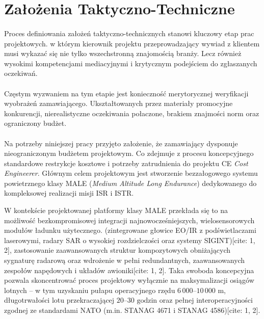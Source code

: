 \section{Założenia Taktyczno-Techniczne}

\paragraph{}
Proces definiowania założeń taktyczno-technicznych stanowi kluczowy etap prac projektowych.
w którym kierownik projektu przeprowadzający wywiad z klientem musi wykazać się nie tylko wszechstronną znajomością branży. 
Lecz również wysokimi kompetencjami mediacyjnymi i krytycznym podejściem do zgłaszanych oczekiwań.

\paragraph{}
Częstym wyzwaniem na tym etapie jest konieczność merytorycznej weryfikacji wyobrażeń zamawiającego.
Ukształtowanych przez materiały promocyjne konkurencji, 
  nierealistyczne oczekiwania połaczone, 
  brakiem znajmości norm oraz ograniczony budżet.

\paragraph{}
Na potrzeby niniejszej pracy przyjęto założenie, 
że zamawiający dysponuje nieograniczonym budżetem projektowym. 
Co zdejmuje z procesu koncepcyjnego standardowe restrykcje kosztowe i potrzeby zatrudnienia do projektu CE \textit{Cost Engineerer}.
Głównym celem projektowym jest stworzenie bezzałogowego systemu powietrznego klasy MALE (\textit{Medium Altitude Long Endurance}) 
dedykowanego do kompleksowej realizacji misji ISR i ISTR. 


W kontekście projektowanej platformy klasy MALE przekłada się to na możliwość bezkompromisowej integracji najnowocześniejszych, 
wielosensorowych modułów ładunku użytecznego.
(zintegrowane głowice EO/IR z podświetlaczami laserowymi, radary SAR o wysokiej 
rozdzielczości oraz systemy SIGINT)[cite: 1, 2], zastosowanie zaawansowanych struktur kompozytowych obniżających sygnaturę radarową oraz 
wdrożenie w pełni redundantnych, zaawansowanych zespołów napędowych i układów awioniki[cite: 1, 2]. 
Taka swoboda koncepcyjna pozwala skoncentrować proces projektowy wyłącznie na maksymalizacji osiągów lotnych –
 w tym uzyskaniu pułapu operacyjnego rzędu $6\,000\text{–}10\,000\text{ m}$, 
 długotrwałości lotu przekraczającej $20\text{–}30\text{ godzin}$ oraz pełnej interoperacyjności zgodnej 
 ze standardami NATO (m.in. STANAG 4671 i STANAG 4586)[cite: 1, 2].



